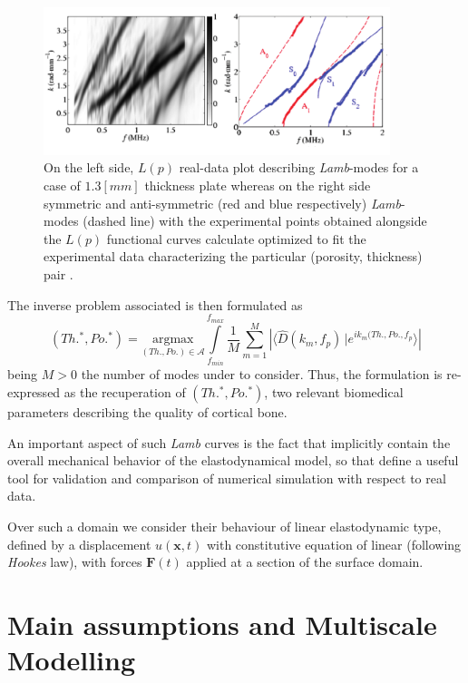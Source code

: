 \begin{figure}[!h]
	\centering
	\includegraphics[width=0.9\textwidth]{images/ImgExt/LW-RealCase.png}
	\caption{On the left side, $L(p)$ real-data plot describing \textit{Lamb}-modes for a case of $1.3 [mm]$ thickness plate whereas on the right side symmetric and anti-symmetric (red and blue respectively) \textit{Lamb}-modes (dashed line) with the experimental points obtained alongside the $L(p)$ functional curves calculate optimized to fit the experimental data characterizing the particular (porosity, thickness) pair \cite{Foiret2014}.}
	\label{RealLM-Image}
\end{figure}


The inverse problem associated is then formulated as
\begin{equation*}
    (Th.^*, Po.^*) = \underset{(Th., Po.) \in \mathcal{A}}{\text{argmax}} \int\limits_{f_{min}}^{f_{max}} \frac{1}{M} \sum_{m=1}^M \left \vert \langle \hat{D}(k_m, f_p)\, \vert e^{ik_m(Th., Po., f_p} \rangle \right \vert
\end{equation*}
being $M>0$ the number of modes under to consider. Thus, the formulation is re-expressed as the recuperation of $(Th.^*, Po.^*)$, two relevant biomedical parameters describing the quality of cortical bone.

An important aspect of such \textit{Lamb} curves is the fact that implicitly contain the overall mechanical behavior of the elastodynamical model, so that define a useful tool for validation and comparison of numerical simulation with respect to real data. 


Over such a domain we consider their behaviour of linear elastodynamic type, defined by a displacement $u(\mathbf{x},t)$ with constitutive equation of linear (following \textit{Hookes} law), with forces $\mathbf{F}(t)$ applied at a section of the surface domain.

\section{Main assumptions and Multiscale Modelling}

